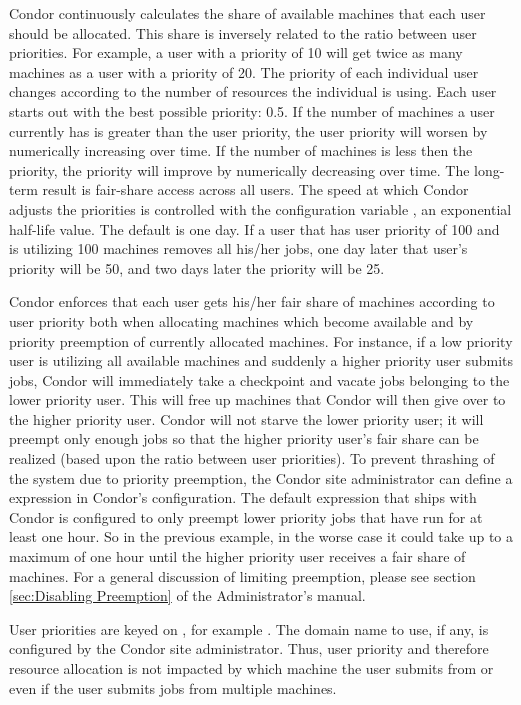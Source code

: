Condor continuously calculates the share of available machines that each
user should be allocated.    This share is inversely related to the ratio
between user priorities.
For example, a user with a priority of 10 will get twice as many
machines as a user with a priority of 20.
The priority of each individual user changes according to
the number of resources the individual is using.
Each user starts out with the best possible priority: 0.5.
If the number of machines a user currently has is greater than 
the user priority,
the user priority will worsen by numerically increasing over time.
If the number of machines is less then the priority,
the priority will improve by numerically decreasing over time. 
The long-term result is fair-share access across all users.
The speed at which Condor adjusts the priorities is
controlled with the configuration variable ,
an exponential half-life value.
The default is one day.
If a user that has user priority of 100 and is
utilizing 100 machines removes all his/her jobs,
one day later that user's
priority will be 50, and two days later the priority will be 25.

Condor enforces that each user gets his/her fair share of machines
according to user priority both when allocating machines which become
available and by priority preemption of currently allocated machines.
For instance, if a low priority user is utilizing all available machines
and suddenly a higher priority user submits jobs, Condor will
immediately take a checkpoint and vacate jobs belonging to the lower priority
user. This will free up machines that Condor will then give over to the
higher priority user. Condor will not starve the lower priority user; it
will preempt only enough jobs so that the higher priority user's fair
share can be realized (based upon the ratio between user priorities). To
prevent thrashing of the system due to priority preemption, the Condor 
site administrator can define a  expression in Condor's configuration.
The default expression that ships with Condor is configured to only preempt 
lower priority jobs that have run
for at least one hour. So in the previous example, in the worse case it
could take up to a maximum of one hour until the higher priority user
receives a fair share of machines.
For a general discussion of
limiting preemption,
please see
section \ref{sec:Disabling Preemption} of the Administrator's manual.

User priorities are keyed on , for example
. The domain name to use, if any, is configured by
the Condor site administrator.  Thus, user priority and therefore resource
allocation is not impacted by which machine the user submits from or
even if the user submits jobs from multiple machines.

